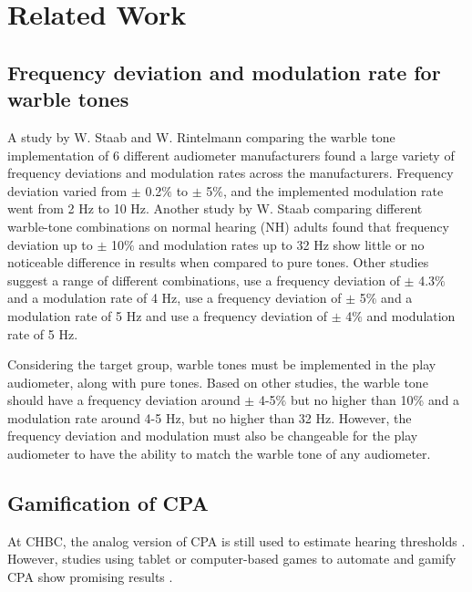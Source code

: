\section{Related Work} \label{related work}

\subsection{Frequency deviation and modulation rate for warble tones}
\label{WarbleTones}



A study by W. Staab and W. Rintelmann \cite{warbleToneStatus} comparing the warble tone implementation of 6 different audiometer manufacturers found a large variety of frequency deviations and modulation rates across the manufacturers. Frequency deviation varied from $\pm$ 0.2$\%$ to $\pm$ 5$\%$, and the implemented modulation rate went from 2 Hz to 10 Hz. Another study by W. Staab \cite{warbleTonesComparison} comparing different warble-tone combinations on normal hearing (NH) adults found that frequency deviation up to $\pm$ 10$\%$ and modulation rates up to 32 Hz show little or no noticeable difference in results when compared to pure tones. Other studies suggest a range of different combinations, \cite{warbleEquation} use a frequency deviation of  $\pm$ 4.3$\%$ and a modulation rate of 4 Hz, \cite{warbleTesting} use a frequency deviation of $\pm$ 5$\%$  and a modulation rate of 5 Hz and \cite{warbleReliabilty} use a frequency deviation of $\pm$ 4$\%$ and modulation rate of 5 Hz. \newline

Considering the target group, warble tones must be implemented in the play audiometer, along with pure tones. Based on other studies, the warble tone should have a frequency deviation around  $\pm$ 4-5$\%$ but no higher than 10\% and a modulation rate around 4-5 Hz, but no higher than 32 Hz. However, the frequency deviation and modulation must also be changeable for the play audiometer to have the ability to match the warble tone of any audiometer. 

\subsection{Gamification of CPA} \label{gamification of CPA}

At CHBC, the analog version of CPA is still used to estimate hearing thresholds \cite{CFBH,loneConversation}. However, studies using tablet or computer-based games to automate and gamify CPA show promising results \cite{ipadAudiometry, self-administeredHL}. \newline

